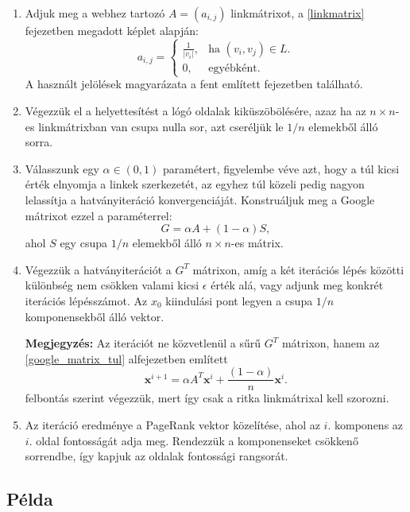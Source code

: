 \documentclass[12pt,a4paper]{article}
\newcommand{\bx}{\mathbf{x}}
\begin{document}
\begin{enumerate}[label=(\Roman*)]
	\item Adjuk meg a webhez tartozó $A = (a_{i,j})$ linkmátrixot, a \ref{linkmatrix} fejezetben megadott képlet alapján: 
	\begin{equation*}
	a_{i,j}=\begin{cases}
	\frac{1}{ |v_i| }, & \text{ha $(v_i,v_j) \in L$}.\\
	0, & \text{egyébként}.
	\end{cases}
	\end{equation*}
	A használt jelölések magyarázata a fent említett fejezetben található.
	
	\item Végezzük el a helyettesítést a lógó oldalak kiküszöbölésére, azaz ha az $n \times n$-es linkmátrixban van csupa nulla sor, azt cseréljük le $1/n$ elemekből álló sorra.
	
	\item Válasszunk egy $\alpha \in (0,1)$ paramétert, figyelembe véve azt, hogy a túl kicsi érték elnyomja a linkek szerkezetét, az egyhez túl közeli pedig nagyon lelassítja a hatványiteráció konvergenciáját. Konstruáljuk meg a Google mátrixot ezzel a paraméterrel:
	\[G = \alpha A + (1-\alpha)S,\]
	ahol $S$ egy csupa $1/n$ elemekből álló $n \times n$-es mátrix. 
	
	\item Végezzük a hatványiterációt a $G^T$ mátrixon, amíg a két iterációs lépés közötti különbség nem csökken valami kicsi $\epsilon$ érték alá, vagy adjunk meg konkrét iterációs lépésszámot. Az $x_0$ kiindulási pont legyen a csupa $1/n$ komponensekből álló vektor.
	
	\textbf{Megjegyzés:} Az iterációt ne közvetlenül a sűrű $G^T$ mátrixon, hanem az \ref{google_matrix_tul} alfejezetben említett
	\[ \bx^{i+1} = \alpha A^T \bx^i + \frac{(1-\alpha)}{n} \bx^i. \] 
	felbontás szerint végezzük, mert így csak a ritka linkmátrixal kell szorozni.
	
	\item Az iteráció eredménye a PageRank vektor közelítése, ahol az $i.$ komponens az $i.$ oldal fontosságát adja meg. Rendezzük a komponenseket csökkenő sorrendbe, így kapjuk az oldalak fontossági rangsorát.
	
\end{enumerate}

\subsection{Példa}
\end{document}
